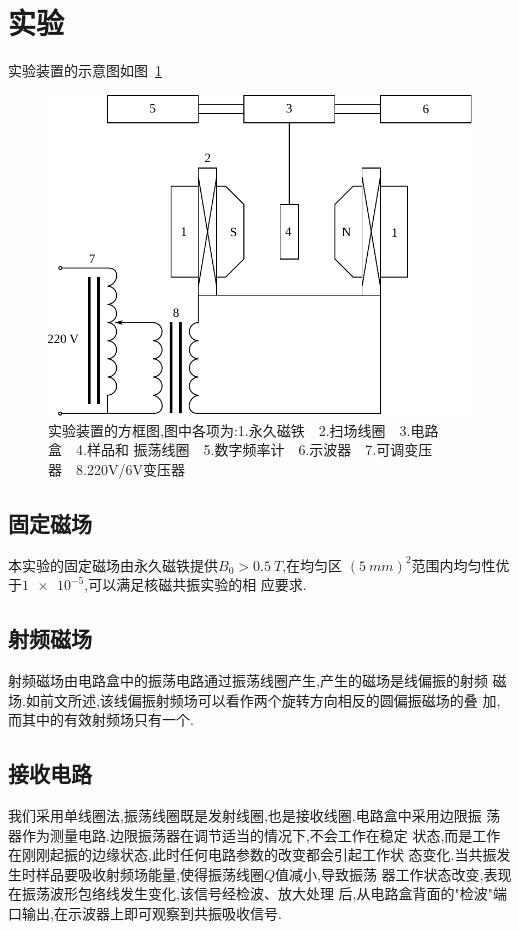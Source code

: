 \documentclass[aps,pre,12pt,preprint,onecolumn,showpacs,showkeys]{revtex4-1}
\begin{document}
\section{实验}

实验装置的示意图如图~\ref{fig:ins}

\begin{figure}[htbp]
  \centering
\includegraphics[width=.7\textwidth]{drawing.pdf}
\caption{\label{fig:ins}%
实验装置的方框图,图中各项为:1.永久磁铁~~2.扫场线圈~~3.电路盒~~4.样品和
振荡线圈~~5.数字频率计~~6.示波器~~7.可调变压器~~8.220V/6V变压器
}
\end{figure}

\subsection{固定磁场}

本实验的固定磁场由永久磁铁提供$B_0 > \SI{0.5}{T}$,在均匀区
$(\SI{5}{mm})^2$范围内均匀性优于$\num{1e-5}$,可以满足核磁共振实验的相
应要求.

\subsection{射频磁场}

射频磁场由电路盒中的振荡电路通过振荡线圈产生,产生的磁场是线偏振的射频
磁场.如前文所述,该线偏振射频场可以看作两个旋转方向相反的圆偏振磁场的叠
加,而其中的有效射频场只有一个.

\subsection{接收电路}

我们采用单线圈法,振荡线圈既是发射线圈,也是接收线圈.电路盒中采用边限振
荡器作为测量电路.边限振荡器在调节适当的情况下,不会工作在稳定
状态,而是工作在刚刚起振的边缘状态,此时任何电路参数的改变都会引起工作状
态变化.当共振发生时样品要吸收射频场能量,使得振荡线圈$Q$值减小,导致振荡
器工作状态改变,表现在振荡波形包络线发生变化,该信号经检波、放大处理
后,从电路盒背面的"检波"端口输出,在示波器上即可观察到共振吸收信号.
\end{document}
